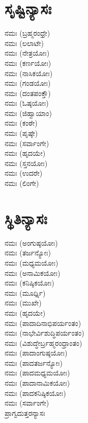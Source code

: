 \section{ಸೃಷ್ಟಿನ್ಯಾಸಃ}
 ನಮಃ (ಬ್ರಹ್ಮರಂಧ್ರೇ)\\
 ನಮಃ (ಲಲಾಟೇ)\\
 ನಮಃ (ನೇತ್ರಯೋಃ)\\
 ನಮಃ (ಕರ್ಣಯೋಃ)\\
 ನಮಃ (ನಾಸಿಕಯೋಃ)\\
 ನಮಃ (ಗಂಡಯೋಃ)\\
 ನಮಃ (ದಂತಪಂಕ್ತೌ)\\
 ನಮಃ (ಓಷ್ಠಯೋಃ)\\
 ನಮಃ (ಜಿಹ್ವಾಯಾಂ)\\
 ನಮಃ (ಕಂಠೇ)\\
 ನಮಃ (ಪೃಷ್ಠೇ)\\
 ನಮಃ (ಸರ್ವಾಂಗೇ)\\
 ನಮಃ (ಹೃದಯೇ)\\
 ನಮಃ (ಸ್ತನಯೋಃ)\\
 ನಮಃ (ಉದರೇ)\\
 ನಮಃ (ಲಿಂಗೇ)
\section{ಸ್ಥಿತಿನ್ಯಾಸಃ}
 ನಮಃ (ಅಂಗುಷ್ಠಯೋಃ)\\
 ನಮಃ (ತರ್ಜನ್ಯೋಃ)\\
 ನಮಃ (ಮಧ್ಯಮಯೋಃ)\\
 ನಮಃ (ಅನಾಮಿಕಯೋಃ)\\
 ನಮಃ (ಕನಿಷ್ಠಿಕಯೋಃ)\\
 ನಮಃ (ಮೂರ್ಧ್ನಿ)\\
 ನಮಃ (ಮುಖೇ)\\
 ನಮಃ (ಹೃದಯೇ)\\
 ನಮಃ (ಪಾದಾದಿನಾಭಿಪರ್ಯಂತಂ)\\
 ನಮಃ (ನಾಭೇರ್ವಿಶುದ್ಧಿಪರ್ಯಂತಂ)\\
 ನಮಃ (ವಿಶುದ್ಧೇರ್ಬ್ರಹ್ಮರಂಧ್ರಾಂತಂ)\\
 ನಮಃ (ಪಾದಾಂಗುಷ್ಠಯೋಃ)\\
 ನಮಃ (ಪಾದತರ್ಜನ್ಯೋಃ)\\
 ನಮಃ (ಪಾದಮಧ್ಯಮಯೋಃ)\\
 ನಮಃ (ಪಾದಾನಾಮಿಕಯೋಃ)\\
 ನಮಃ (ಪಾದಕನಿಷ್ಠಿಕಯೋಃ)\\
 ನಮಃ (ಸರ್ವಾಂಗೇ)\\
ಪ್ರಾಗ್ವದುತ್ತರನ್ಯಾಸಃ
